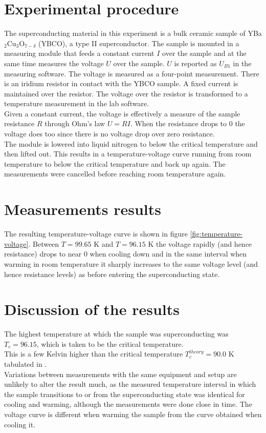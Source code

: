 \documentclass[a4paper,twoside=false,abstract=false,numbers=noenddot,
titlepage=false,headings=small,parskip=half,version=last]{scrartcl}
\begin{document}
\section{Experimental procedure}
The superconducting material in this experiment is a bulk ceramic sample of
YBa$_2$Cu$_3$O$_{7-\delta}$ (YBCO), a type II superconductor.
The sample is mounted in a measuring module that feeds a constant current $I$
over the sample and at the same time measures the voltage $U$ over the sample.
$U$ is reported as $U_{B1}$ in the measuring software.
The voltage is measured as a four-point measurement.
There is an iridium resistor in contact with the YBCO sample.
A fixed current is maintained over the resistor.
The voltage over the resistor is transformed to a temperature measurement in the lab software.\\
Given a constant current, the voltage is effectively a measure of the sample
resistance $R$ through Ohm's law $U=RI$.
When the resistance drops to 0 the voltage does too since there is no voltage drop over zero resistance.\\
The module is lowered into liquid nitrogen to below the critical temperature and then lifted out.
This results in a temperature-voltage curve running from room temperature to below the critical temperature and back up again.
The measurements were cancelled before reaching room temperature again.

\section{Measurements results}
The resulting temperature-voltage curve is shown in figure
\ref{fig:temperature-voltage}. Between $T = 99.65$ K and $T = 96.15$ K the
voltage rapidly (and hence resistance) drops to near 0 when cooling down and in
the same interval when warming in room temperature it sharply increases to the
same voltage level (and hence resistance levels) as before entering the superconducting state.

\section{Discussion of the results}
The highest temperature at which the sample was superconducting was $T_c = 96.15$, which is taken to be the critical temperature.\\
This is a few Kelvin higher than the critical temperature $T_c^{theory}=90.0$ K
tabulated in \cite{Kittel}.\\
Variations between measurements with the same equipment and setup are unlikely to alter the result much, as the measured temperature interval in which the sample transitions to or from the superconducting state was identical for cooling and warming, although the measurements were done close in time.
The voltage curve is different when warming the sample from the curve obtained when cooling it.
\end{document}
